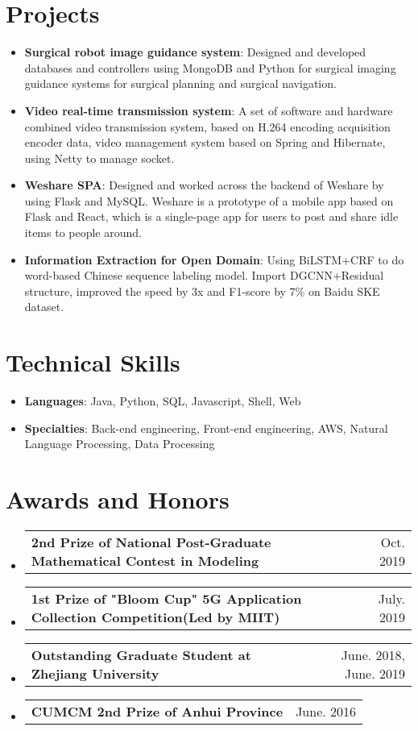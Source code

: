 \documentclass[letterpaper,11pt]{resume-chinese}
\makeatletter
\newcommand{\resumeItem}[2]{
  \vspace{+2pt}
  \item\small{
    \textbf{#1}{: #2 \vspace{-2pt}}
  }
}
\newcommand{\resumeSubItemTime}[2]{
  \vspace{5 pt}\item
    \begin{tabular*}{0.97\textwidth}{l@{\extracolsep{\fill}}r}
      \textbf{#1} & #2 \\
    \end{tabular*}\vspace{-18pt}
}
\newcommand{\resumeSubItem}[2]{\vspace{+4pt}\resumeItem{#1}{#2}\vspace{-4pt}}
\newcommand{\resumeSubHeadingListStart}{\begin{itemize}[leftmargin=*]}
\newcommand{\resumeSubHeadingListEnd}{\end{itemize}}
\makeatother
\begin{document}
\section{Projects}
  \resumeSubHeadingListStart
    \resumeSubItem{Surgical robot image guidance system}
        {Designed and developed databases and controllers using MongoDB and Python for surgical imaging guidance systems for surgical planning and surgical navigation.}
    \resumeSubItem{Video real-time transmission system}
        {A set of software and hardware combined video transmission system, based on H.264 encoding acquisition encoder data, video management system based on Spring and Hibernate, using Netty to manage socket.}
    \resumeSubItem{Weshare SPA}
        {Designed and worked across the backend of Weshare by using Flask and MySQL. Weshare is a prototype of a mobile app based on Flask and React, which is a single-page app for users to post and share idle items to people around.}
    \resumeSubItem{Information Extraction for Open Domain}
        {Using BiLSTM+CRF to do word-based Chinese sequence labeling model. Import DGCNN+Residual structure, improved the speed by 3x and F1-score by 7\% on Baidu SKE dataset.}
  \resumeSubHeadingListEnd


\section{Technical Skills}
 \resumeSubHeadingListStart
    \resumeSubItem{Languages}
      {Java, Python, SQL, Javascript, Shell, Web}
    \resumeSubItem{Specialties}
      {Back-end engineering, Front-end engineering, AWS, Natural Language Processing, Data Processing}
 \resumeSubHeadingListEnd

\section{Awards and Honors}
 \resumeSubHeadingListStart
    \resumeSubItemTime
    {2nd Prize of National Post-Graduate Mathematical Contest in Modeling}
    {Oct. 2019}
    \resumeSubItemTime
    {1st Prize of "Bloom Cup" 5G Application Collection Competition(Led by MIIT)}
    {July. 2019}
    \resumeSubItemTime
    {Outstanding Graduate Student at Zhejiang University}
    {June. 2018, June. 2019}
    \resumeSubItemTime
    {CUMCM 2nd Prize of Anhui Province}
    {June. 2016}
 \resumeSubHeadingListEnd

\end{document}
